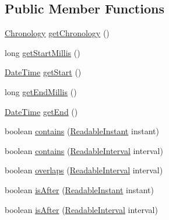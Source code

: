 \subsection*{Public Member Functions}
\begin{DoxyCompactItemize}
\item 
\hyperlink{classorg_1_1joda_1_1time_1_1_chronology}{Chronology} \hyperlink{interfaceorg_1_1joda_1_1time_1_1_readable_interval_a3b86ab8838c9075537b49b071cde957e}{get\-Chronology} ()
\item 
long \hyperlink{interfaceorg_1_1joda_1_1time_1_1_readable_interval_aea3b67c07ffdbde8149a6122ee52b7a6}{get\-Start\-Millis} ()
\item 
\hyperlink{classorg_1_1joda_1_1time_1_1_date_time}{Date\-Time} \hyperlink{interfaceorg_1_1joda_1_1time_1_1_readable_interval_a5d541e494f535ba99a957d43a1c95c10}{get\-Start} ()
\item 
long \hyperlink{interfaceorg_1_1joda_1_1time_1_1_readable_interval_a47c96c1bd46887148080f3610c822682}{get\-End\-Millis} ()
\item 
\hyperlink{classorg_1_1joda_1_1time_1_1_date_time}{Date\-Time} \hyperlink{interfaceorg_1_1joda_1_1time_1_1_readable_interval_a6bc6f7821c29c4e1b4804b11455a5117}{get\-End} ()
\item 
boolean \hyperlink{interfaceorg_1_1joda_1_1time_1_1_readable_interval_adeb878a35866c3518ee2bba7d896c015}{contains} (\hyperlink{interfaceorg_1_1joda_1_1time_1_1_readable_instant}{Readable\-Instant} instant)
\item 
boolean \hyperlink{interfaceorg_1_1joda_1_1time_1_1_readable_interval_a515aa9582b01956a5b1ac7afab89d1ac}{contains} (\hyperlink{interfaceorg_1_1joda_1_1time_1_1_readable_interval}{Readable\-Interval} interval)
\item 
boolean \hyperlink{interfaceorg_1_1joda_1_1time_1_1_readable_interval_ade38a0cacd1ce84b9b0c3a2c061e2740}{overlaps} (\hyperlink{interfaceorg_1_1joda_1_1time_1_1_readable_interval}{Readable\-Interval} interval)
\item 
boolean \hyperlink{interfaceorg_1_1joda_1_1time_1_1_readable_interval_aea790c7afa232833d7e7e6000510a45d}{is\-After} (\hyperlink{interfaceorg_1_1joda_1_1time_1_1_readable_instant}{Readable\-Instant} instant)
\item 
boolean \hyperlink{interfaceorg_1_1joda_1_1time_1_1_readable_interval_ae108f517a32c6cf9270e29f421af95b7}{is\-After} (\hyperlink{interfaceorg_1_1joda_1_1time_1_1_readable_interval}{Readable\-Interval} interval)
\item 

\end{DoxyCompactItemize}
